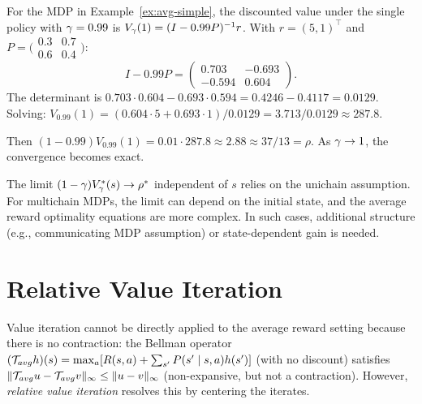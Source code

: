 \documentclass[11pt,a4paper]{article}
\begin{document}
\begin{example}
\label{ex:discount-to-avg}
For the MDP in Example~\ref{ex:avg-simple}, the discounted value
under the single policy with $\gamma = 0.99$ is
$V_\gamma(1) = (I - 0.99P)^{-1} r$. With
$r = (5, 1)^\top$ and $P = \bigl(\begin{smallmatrix}
0.3 & 0.7 \\ 0.6 & 0.4\end{smallmatrix}\bigr)$:
\[
    I - 0.99P = \begin{pmatrix}
    0.703 & -0.693 \\ -0.594 & 0.604
    \end{pmatrix}.
\]
The determinant is $0.703 \cdot 0.604 - 0.693 \cdot 0.594
= 0.4246 - 0.4117 = 0.0129$. Solving:
$V_{0.99}(1) = (0.604 \cdot 5 + 0.693 \cdot 1)/0.0129
= 3.713/0.0129 \approx 287.8$.

Then $(1-0.99) V_{0.99}(1) = 0.01 \cdot 287.8 \approx 2.88
\approx 37/13 = \rho$. As $\gamma \to 1$, the convergence
becomes exact.
\end{example}

\begin{warning}[title={Average Reward Requires Ergodicity}]
The limit $(1-\gamma)V^*_\gamma(s) \to \rho^*$ independent
of $s$ relies on the unichain assumption. For multichain MDPs, the
limit can depend on the initial state, and the average reward
optimality equations are more complex. In such cases, additional
structure (e.g., communicating MDP assumption) or state-dependent
gain is needed.
\end{warning}


\section{Relative Value Iteration}
\label{sec:rvi}

Value iteration cannot be directly applied to the average reward
setting because there is no contraction: the Bellman operator
$(\mathcal{T}_{avg} h)(s) = \max_a [R(s,a) + \sum_{s'} P(s' \mid s,a)
h(s')]$ (with no discount) satisfies
$\|\mathcal{T}_{avg} u - \mathcal{T}_{avg} v\|_\infty \leq
\|u - v\|_\infty$ (non-expansive, but not a contraction). However,
\emph{relative value iteration} resolves this by centering the
iterates.
\end{document}
